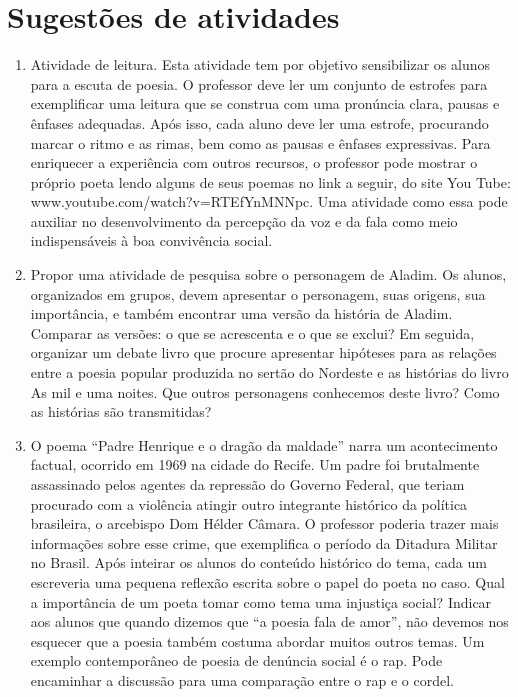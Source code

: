 \section{Sugestões de atividades}
\begin{enumerate}


\item Atividade de leitura. Esta atividade tem por objetivo sensibilizar os
  alunos para a escuta de poesia. O professor deve ler um conjunto de estrofes
  para exemplificar uma leitura que se construa com uma pronúncia clara, pausas
  e ênfases adequadas. Após isso, cada aluno deve ler uma estrofe, procurando
  marcar o ritmo e as rimas, bem como as pausas e ênfases expressivas. Para
  enriquecer a experiência com outros recursos, o professor pode mostrar o
  próprio poeta lendo alguns de seus poemas no link a seguir, do site You Tube:
  www.youtube.com/watch?v=RTEfYnMNNpc. Uma atividade como essa pode
  auxiliar no desenvolvimento da percepção da voz e da fala como meio
  indispensáveis à boa convivência social.

\item Propor uma atividade de pesquisa sobre o personagem de Aladim. Os alunos,
  organizados em grupos, devem apresentar o personagem, suas origens, sua
  importância, e também encontrar uma versão da história de Aladim. Comparar as
  versões: o que se acrescenta e o que se exclui? Em seguida, organizar um
  debate livro que procure apresentar hipóteses para as relações entre a poesia
  popular produzida no sertão do Nordeste e as histórias do livro As mil e uma
  noites. Que outros personagens conhecemos deste livro? Como as histórias são
  transmitidas?

\item O poema “Padre Henrique e o dragão da maldade” narra um acontecimento
  factual, ocorrido em 1969 na cidade do Recife. Um padre foi brutalmente
  assassinado pelos agentes da repressão do Governo Federal, que teriam
  procurado com a violência atingir outro integrante histórico da política
  brasileira, o arcebispo Dom Hélder Câmara. O professor poderia trazer mais
  informações sobre esse crime, que exemplifica o período da Ditadura Militar
  no Brasil. Após inteirar os alunos do conteúdo histórico do tema, cada um
  escreveria uma pequena reflexão escrita sobre o papel do poeta no caso. Qual
  a importância de um poeta tomar como tema uma injustiça social? Indicar aos
  alunos que quando dizemos que “a poesia fala de amor”, não devemos nos
  esquecer que a poesia também costuma abordar muitos outros temas. Um exemplo
  contemporâneo de poesia de denúncia social é o rap. Pode encaminhar a
  discussão para uma comparação entre o rap e o cordel.


\end{enumerate}
